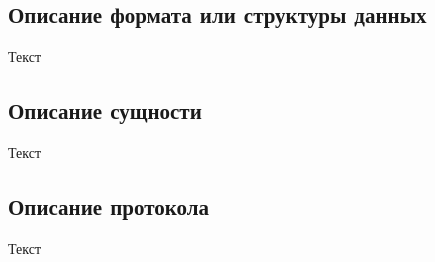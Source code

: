\documentclass[../document.tex]{subfiles}
\begin{document}
\subsection{Описание формата или структуры данных}
\par Текст
\subsection{Описание сущности}
\par Текст
\subsection{Описание протокола}
\par Текст
\end{document}
